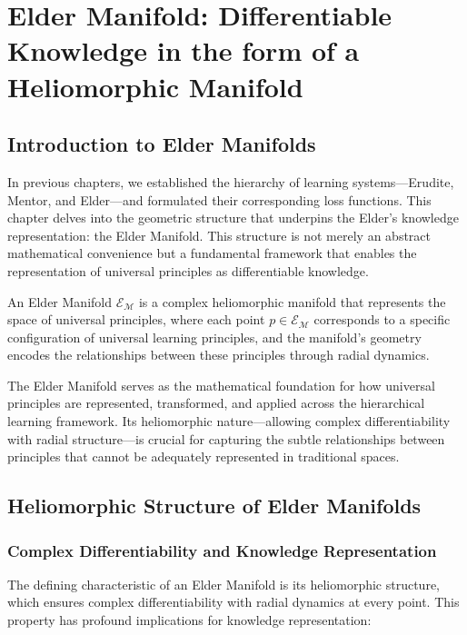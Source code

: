 \chapter{Elder Manifold: Differentiable Knowledge in the form of a Heliomorphic Manifold}

\section{Introduction to Elder Manifolds}

In previous chapters, we established the hierarchy of learning systems—Erudite, Mentor, and Elder—and formulated their corresponding loss functions. This chapter delves into the geometric structure that underpins the Elder's knowledge representation: the Elder Manifold. This structure is not merely an abstract mathematical convenience but a fundamental framework that enables the representation of universal principles as differentiable knowledge.

\begin{definition}
An Elder Manifold $\mathcal{E}_{\mathcal{M}}$ is a complex heliomorphic manifold that represents the space of universal principles, where each point $p \in \mathcal{E}_{\mathcal{M}}$ corresponds to a specific configuration of universal learning principles, and the manifold's geometry encodes the relationships between these principles through radial dynamics.
\end{definition}

The Elder Manifold serves as the mathematical foundation for how universal principles are represented, transformed, and applied across the hierarchical learning framework. Its heliomorphic nature—allowing complex differentiability with radial structure—is crucial for capturing the subtle relationships between principles that cannot be adequately represented in traditional spaces.

\section{Heliomorphic Structure of Elder Manifolds}

\subsection{Complex Differentiability and Knowledge Representation}

The defining characteristic of an Elder Manifold is its heliomorphic structure, which ensures complex differentiability with radial dynamics at every point. This property has profound implications for knowledge representation:

